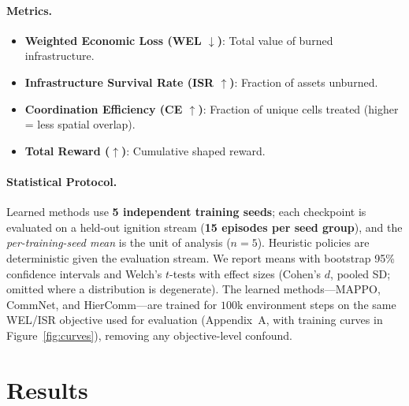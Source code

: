 \documentclass[letterpaper]{article}
\begin{document}
\paragraph{Metrics.}
\begin{itemize}
    \item \textbf{Weighted Economic Loss (WEL $\downarrow$)}: Total value of burned infrastructure.
    \item \textbf{Infrastructure Survival Rate (ISR $\uparrow$)}: Fraction of assets unburned.
    \item \textbf{Coordination Efficiency (CE $\uparrow$)}: Fraction of unique cells treated (higher = less spatial overlap).
    \item \textbf{Total Reward ($\uparrow$)}: Cumulative shaped reward.
\end{itemize}

\paragraph{Statistical Protocol.}
Learned methods use \textbf{5 independent training seeds}; each checkpoint is evaluated on a held-out ignition stream (\textbf{15 episodes per seed group}), and the \emph{per-training-seed mean} is the unit of analysis ($n=5$). Heuristic policies are deterministic given the evaluation stream. We report means with bootstrap 95\% confidence intervals and Welch's $t$-tests with effect sizes (Cohen's $d$, pooled SD; omitted where a distribution is degenerate). The learned methods---MAPPO, CommNet, and HierComm---are trained for $100$k environment steps on the same WEL/ISR objective used for evaluation (Appendix~A, with training curves in Figure~\ref{fig:curves}), removing any objective-level confound.

\section{Results}
\label{sec:results}
\end{document}
